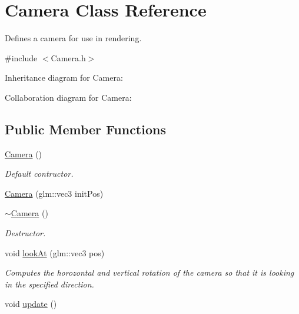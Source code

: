 \hypertarget{class_camera}{\section{Camera Class Reference}
\label{class_camera}
}


Defines a camera for use in rendering.  




{\ttfamily \#include $<$Camera.\-h$>$}



Inheritance diagram for Camera\-:


Collaboration diagram for Camera\-:
\subsection*{Public Member Functions}
\begin{DoxyCompactItemize}
\item 
\hyperlink{class_camera_a01f94c3543f56ede7af49dc778f19331}{Camera} ()
\begin{DoxyCompactList}\small\item\em Default contructor. \end{DoxyCompactList}\item 
\hyperlink{class_camera_a7637bc2b9ce0cbe99a828382dc1cec04}{Camera} (glm\-::vec3 init\-Pos)
\item 
\hypertarget{class_camera_ad1897942d0ccf91052386388a497349f}{\hyperlink{class_camera_ad1897942d0ccf91052386388a497349f}{$\sim$\-Camera} ()}\label{class_camera_ad1897942d0ccf91052386388a497349f}

\begin{DoxyCompactList}\small\item\em Destructor. \end{DoxyCompactList}\item 
void \hyperlink{class_camera_aae346bd34a4af9cab3da7e135417e32f}{look\-At} (glm\-::vec3 pos)
\begin{DoxyCompactList}\small\item\em Computes the horozontal and vertical rotation of the camera so that it is looking in the specified direction. \end{DoxyCompactList}\item 
\hypertarget{class_camera_a42cda7239981a5618660d04bd5893556}{void \hyperlink{class_camera_a42cda7239981a5618660d04bd5893556}{update} ()}\label{class_camera_a42cda7239981a5618660d04bd5893556}


\end{DoxyCompactItemize}
